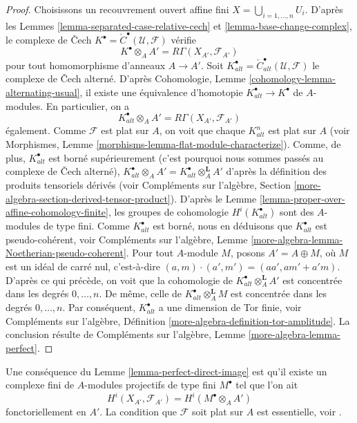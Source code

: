 \begin{proof}
Choisissons un recouvrement ouvert affine fini $X = \bigcup_{i = 1, \ldots, n} U_i$.
D'après les Lemmes \ref{lemma-separated-case-relative-cech} et
\ref{lemma-base-change-complex}, le complexe de {\v C}ech
$K^\bullet = {\check C}^\bullet(\mathcal{U}, \mathcal{F})$ vérifie
$$
K^\bullet \otimes_A A' = R\Gamma(X_{A'}, \mathcal{F}_{A'})
$$
pour tout homomorphisme d'anneaux $A \to A'$. Soit
$K_{alt}^\bullet = {\check C}_{alt}^\bullet(\mathcal{U}, \mathcal{F})$
le complexe de {\v C}ech alterné. D'après
Cohomologie, Lemme \ref{cohomology-lemma-alternating-usual},
il existe une équivalence d'homotopie $K_{alt}^\bullet \to K^\bullet$
de $A$-modules. En particulier, on a
$$
K_{alt}^\bullet \otimes_A A' = R\Gamma(X_{A'}, \mathcal{F}_{A'})
$$
également. Comme $\mathcal{F}$ est plat sur $A$, on voit que chaque $K_{alt}^n$
est plat sur $A$ (voir
Morphismes, Lemme \ref{morphisms-lemma-flat-module-characterize}).
Comme, de plus, $K_{alt}^\bullet$ est borné supérieurement (c'est pourquoi nous sommes passés
au complexe de {\v C}ech alterné),
$K_{alt}^\bullet \otimes_A A' = K_{alt}^\bullet \otimes_A^{\mathbf{L}} A'$
d'après la définition des produits tensoriels dérivés (voir
Compléments sur l'algèbre, Section \ref{more-algebra-section-derived-tensor-product}).
D'après le
Lemme \ref{lemma-proper-over-affine-cohomology-finite},
les groupes de cohomologie $H^i(K_{alt}^\bullet)$ sont des $A$-modules de type fini.
Comme $K_{alt}^\bullet$ est borné, nous en déduisons que $K_{alt}^\bullet$
est pseudo-cohérent, voir
Compléments sur l'algèbre, Lemme \ref{more-algebra-lemma-Noetherian-pseudo-coherent}.
Pour tout $A$-module $M$, posons $A' = A \oplus M$, où $M$ est un idéal de carré nul,
c'est-à-dire $(a, m) \cdot (a', m') = (aa', am' + a'm)$. D'après ce qui précède,
on voit que la cohomologie de $K_{alt}^\bullet \otimes_A^\mathbf{L} A'$ est concentrée
dans les degrés $0, \ldots, n$. De même, celle de $K_{alt}^\bullet \otimes_A^\mathbf{L} M$
est concentrée dans les degrés $0, \ldots, n$. Par conséquent, $K_{alt}^\bullet$ a une
dimension de Tor finie, voir
Compléments sur l'algèbre, Définition \ref{more-algebra-definition-tor-amplitude}.
La conclusion résulte de Compléments sur l'algèbre, Lemme \ref{more-algebra-lemma-perfect}.
\end{proof}

\begin{remark}
\label{remark-explain-perfect-direct-image}
Une conséquence du Lemme \ref{lemma-perfect-direct-image} est qu'il
existe un complexe fini de $A$-modules projectifs de type fini $M^\bullet$ tel
que l'on ait
$$
H^i(X_{A'}, \mathcal{F}_{A'}) = H^i(M^\bullet \otimes_A A')
$$
fonctoriellement en $A'$. La condition que $\mathcal{F}$ soit
plat sur $A$ est essentielle, voir \cite{Hartshorne}.
\end{remark}
